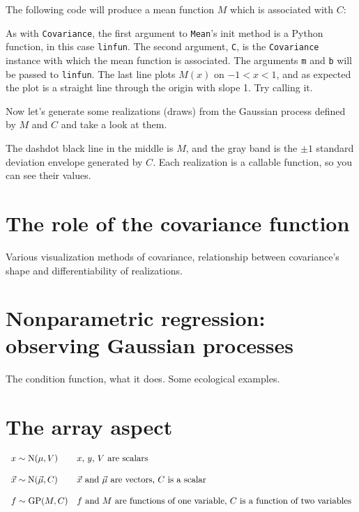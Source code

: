 \documentclass{manual}
\begin{document}
The following code will produce a mean function $M$ which is associated with $C$:


\bigskip
As with \texttt{Covariance}, the first argument to \texttt{Mean}'s init method is a Python function, in this case \texttt{linfun}. The second argument, \texttt{C}, is the \texttt{Covariance} instance with which the mean function is associated. The arguments \texttt{m} and \texttt{b} will be passed to \texttt{linfun}. The last line plots $M(x)$ on $-1<x<1$, and as expected the plot is a straight line through the origin with slope 1. Try calling it.

Now let's generate some realizations (draws) from the Gaussian process defined by $M$ and $C$ and take a look at them.


\bigskip
The dashdot black line in the middle is $M$, and the gray band is the $\pm 1$ standard deviation envelope generated by $C$. Each realization is a callable function, so you can see their values.



\section{The role of the covariance function}\label{sec:cov} %

Various visualization methods of covariance, relationship between covariance's shape and differentiability of realizations.



\section{Nonparametric regression: observing Gaussian processes}\label{sec:observing} %

The condition function, what it does. Some ecological examples.



\section{The array aspect}\label{sec:array} %

\begin{equation}
    \begin{array}{ll}
        x\sim\textup N(\mu,V) & \textup{$x$, $y$, $V$ are scalars}\\\\
        \vec x\sim\textup N(\vec \mu,C)& \textup{$\vec x$ and $\vec \mu$ are vectors, $C$ is a scalar}\\\\
        f\sim\textup{GP}(M, C) & \textup{$f$ and $M$ are functions of one variable, $C$ is a function of two variables}
    \end{array}
\end{equation}
\end{document}
